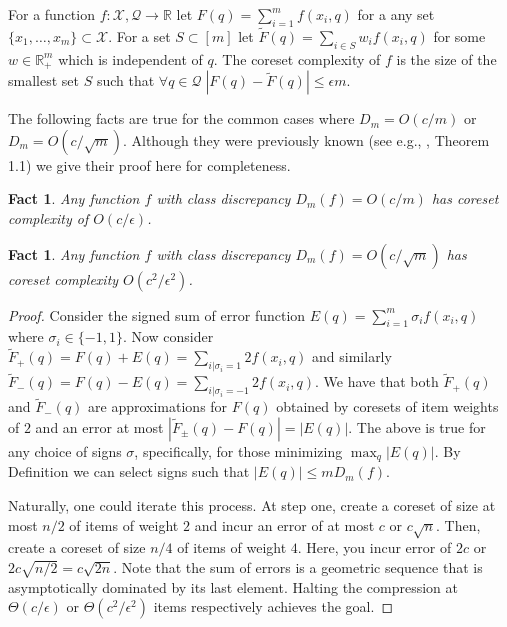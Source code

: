 \documentclass[anon,12pt]{colt2019} %
\newtheorem{fact}[theorem]{Fact}
\newcommand{\R}{\mathbb{R}}
\newcommand{\eps}{\epsilon}
\newcommand{\X}{\mathcal{X}}
\newcommand{\Q}{\mathcal{Q}}
\begin{document}
\begin{definition}  
For a function $f:\X,\Q\rightarrow \R$ let $F(q) = \sum_{i=1}^{m} f(x_i,q)$ for a any set $\{x_1,\ldots,x_m\} \subset \X$.
For a set $S \subset [m]$ let $\tilde F(q) = \sum_{i \in S}w_i f(x_i,q)$ for some $w\in\R_+^m$ which is independent of $q$.
The coreset complexity of $f$ is the size of the smallest set $S$ such that $\forall q \in \Q \; |F(q)  - \tilde F(q)| \le \eps m$.
\end{definition}
\noindent The following facts are true for the common cases where $D_m = O(c/m)$ or $D_m = O(c/\sqrt{m})$. Although they were previously known (see e.g., \cite{phillips2009small}, Theorem 1.1) we give their proof here for completeness.
\begin{fact}\label{fct:eps1}
Any function $f$ with class discrepancy $D_m(f) = O(c/m)$ has coreset complexity of $O(c/\eps)$.
\end{fact}
\begin{fact}\label{fct:eps2}
Any function $f$ with class discrepancy $D_m(f) = O(c/\sqrt{m})$ has coreset complexity $O(c^2/\eps^2)$.
\end{fact}
\begin{proof}
\noindent  Consider the signed sum of error function $E(q) = \sum_{i=1}^{m} \sigma_i f(x_i,q)$ where $\sigma_i \in \{-1,1\}$.
Now consider $\tilde F_{+}(q) = F(q) + E(q)   = \sum_{i | \sigma_i=1} 2 f(x_i,q)$ and similarly $\tilde F_{-}(q) = F(q) - E(q)  =  \sum_{i | \sigma_i=-1} 2 f(x_i,q)$. We have that both $\tilde F_{+}(q)$ and $\tilde F_{-}(q)$ are approximations for $F(q)$ obtained by coresets of item weights of $2$ and an error at most $|\tilde F_{\pm}(q)- F(q)| =  |E(q)|$. The above is true for any choice of signs $\sigma$, specifically, for those minimizing $\max_q | E(q)|$.
By Definition we can select signs such that $|E(q)| \le m D_m(f)$.

Naturally, one could iterate this process.
At step one, create a coreset of size at most $n/2$ of items of weight $2$ and incur an error of at most $c$ or $c \sqrt{n}$.
Then, create a coreset of size $n/4$ of items of weight $4$. Here, you incur error of $2c$ or $2c\sqrt{n/2}  = c\sqrt{2n}$.
Note that the sum of errors is a geometric sequence that is asymptotically dominated by its last element. 
Halting the compression at $\Theta(c/\eps)$ or $\Theta(c^2/\eps^2)$ items respectively achieves the goal.
\end{proof}
\end{document}
